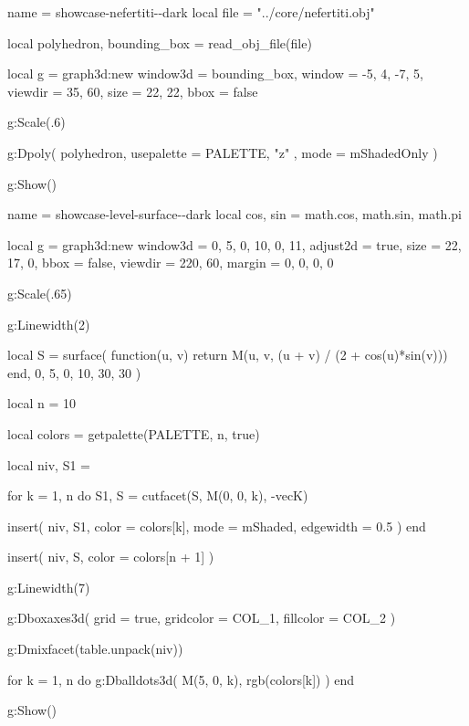 
\vfill

\begin{luadraw}{name = showcase-nefertiti-\PALETTE-dark}
local file = "../core/nefertiti.obj"

local polyhedron, bounding_box = read_obj_file(file)

local g = graph3d:new{
  window3d = bounding_box,
  window   = {-5, 4, -7, 5},
  viewdir  = {35, 60},
  size     = {22, 22},
  bbox     = false
}

g:Scale(.6)

g:Dpoly(
  polyhedron,
  {
    usepalette = {PALETTE, "z" },
    mode       = mShadedOnly
  }
)

g:Show()
\end{luadraw}



\vfill

\begin{luadraw}{name = showcase-level-surface-\PALETTE-dark}
local cos, sin = math.cos, math.sin, math.pi

local g = graph3d:new{
  window3d = {0, 5, 0, 10, 0, 11},
  adjust2d = true,
  size     = {22, 17, 0},
  bbox     = false,
  viewdir  = {220, 60},
  margin   = {0, 0, 0, 0}
}

g:Scale(.65)

g:Linewidth(2)

local S = surface(
  function(u, v)
    return M(u, v, (u + v) / (2 + cos(u)*sin(v)))
  end,
  0, 5, 0, 10,
  {30, 30}
)

local n = 10

local colors = getpalette(PALETTE, n, true)

local niv, S1 = {}

for k = 1, n do
  S1, S = cutfacet(S, {M(0, 0, k), -vecK})

  insert(
    niv,
    {
      S1,
      {
        color     = colors[k],
        mode      = mShaded,
        edgewidth = 0.5
      }
    }
  )
end

insert(
  niv,
  {
    S,
    {color = colors[n + 1]}
  }
)

g:Linewidth(7)

g:Dboxaxes3d({
  grid      = true,
  gridcolor = COL_1,
  fillcolor = COL_2
})

g:Dmixfacet(table.unpack(niv))

for k = 1, n do
  g:Dballdots3d(
    M(5, 0, k),
    rgb(colors[k])
  )
end

g:Show()
\end{luadraw}


